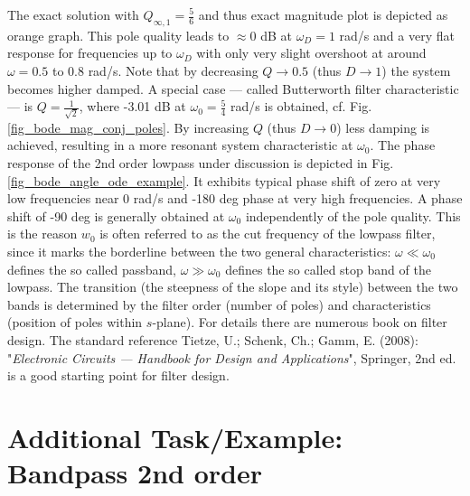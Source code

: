 \documentclass[a4paper,11pt,oneside]{scrartcl}
\begin{document}
The exact solution with $Q_{\infty,1}=\frac{5}{6}$ and thus exact magnitude plot is depicted as orange graph. This pole quality leads to $\approx 0$ dB at $\omega_D=1$ rad/s and a very flat response for frequencies up to $\omega_D$
with only very slight overshoot at around $\omega = 0.5$ to $0.8$ rad/s.
Note that by decreasing $Q\rightarrow 0.5$ (thus $D\rightarrow 1$) the system becomes higher damped. A special case --- called Butterworth filter characteristic --- is
$Q = \frac{1}{\sqrt{2}}$, where -3.01 dB at $\omega_0 = \frac{5}{4}$ rad/s is obtained, cf. Fig. \ref{fig_bode_mag_conj_poles}.
By increasing $Q$ (thus $D\rightarrow 0$) less damping is achieved, resulting in a more resonant system characteristic at $\omega_0$.
%
The phase response of the 2nd order lowpass under discussion is depicted
in Fig. \ref{fig_bode_angle_ode_example}.
It exhibits typical phase shift of zero at very low frequencies near 0 rad/s and -180 deg phase at very high frequencies.
A phase shift of -90 deg is generally obtained at $\omega_0$ independently of
the pole quality.
This is the reason $w_0$ is often referred to as the cut frequency
of the lowpass filter, since it marks the borderline between the two general characteristics: $\omega \ll \omega_0$ defines the so called passband, $\omega \gg \omega_0$ defines the so called stop band of the lowpass. The transition
(the steepness of the slope and its style) between the two bands is
determined by the filter order (number of poles) and characteristics (position of poles within $s$-plane).
For details there are numerous book on filter design. The standard reference Tietze, U.; Schenk, Ch.; Gamm, E. (2008): "\textit{Electronic Circuits --- Handbook for Design and Applications}", Springer, 2nd ed. is a good starting point for filter design.





\section{Additional Task/Example: Bandpass 2nd order}
\end{document}
